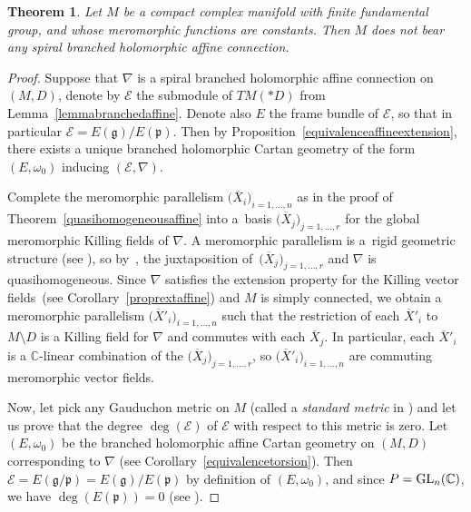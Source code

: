 \documentclass[10pt,a4paper]{amsart}
\numberwithin{equation}{section}
\newtheorem{Theorem}{Theorem}[section]
\begin{document}
\begin{Theorem}\label{classificationaffine} Let $M$ be a compact complex manifold with finite fundamental group, and whose meromorphic functions are constants. Then $M$ does not bear any spiral branched holomorphic affine connection.
\end{Theorem}
\begin{proof} Suppose that $\nabla$ is a spiral branched holomorphic affine connection on $(M,D)$, denote by $\mathcal{E}$ the submodule of $TM(* D)$ from Lemma~\ref{lemmabranchedaffine}. Denote also $E$ the frame bundle of $\mathcal{E}$, so that in particular $\mathcal{E}=E(\mathfrak{g})/E(\mathfrak{p})$. Then by Proposition~\ref{equivalenceaffineextension}, there exists a unique branched holomorphic Cartan geometry of the form $(E,\omega_0)$ inducing $(\mathcal{E},\nabla)$.

Complete the meromorphic parallelism $\big(\overline{X}_i\big)_{i=1,\dots,n}$ as in the proof of Theorem~\ref{quasihomogeneousaffine} into a~basis $\big(\overline{X}_j\big)_{j=1,\dots,r}$ for the global meromorphic Killing fields of $\nabla$. A meromorphic parallelism is a~rigid geometric structure (see \cite{DumitrescuQuasi}), so by~\cite[Theorem 2]{Dumitrescu0}, the juxtaposition of~$\big(\overline{X}_j\big)_{j=1,\dots,r}$ and $\nabla$ is quasihomogeneous. Since $\nabla$ satisfies the extension property for the Killing vector fields~(see Corollary~\ref{proprextaffine}) and $M$ is simply connected, we obtain a meromorphic parallelism $\big(\overline{X}'_i\big)_{i=1,\dots,n}$ such that the restriction of each $\overline{X}'_i$ to $M\setminus D$ is a Killing field for $\nabla$ and commutes with each $\overline{X}_j$. In particular, each $\overline{X}'_i$ is a $\mathbb{C}$-linear combination of the $\big(\overline{X}_j\big)_{j=1,\dots,r}$, so $\big(\overline{X}'_i\big)_{i=1,\dots,n}$ are commuting meromorphic vector fields.

Now, let pick any Gauduchon metric on $M$ (called a \textit{standard metric} in \cite[p.~502]{Gauduchon}) and let us prove that the degree $\deg (\mathcal{E})$ of $\mathcal{E}$ with respect to this metric is zero. Let $(E,\omega_0)$ be the branched holomorphic affine Cartan geometry on $(M,D)$ corresponding to $\nabla$ (see Corollary~\ref{equivalencetorsion}). Then $\mathcal{E}=E(\mathfrak{g}/\mathfrak{p})=E(\mathfrak{g})/E(\mathfrak{p})$ by definition of $(E,\omega_0)$, and since $P={\rm GL}_n(\mathbb{C})$, we have $\deg (E(\mathfrak{p}))=0$ (see \cite[Corollary 4.2]{BD}).


\end{proof}
\end{document}
